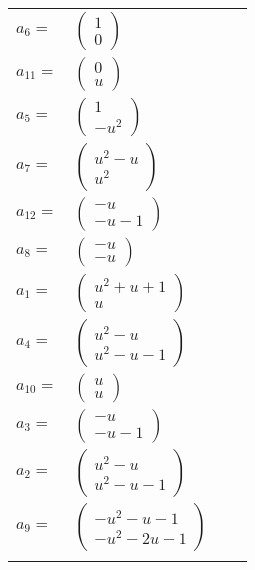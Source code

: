 \documentclass[1p]{elsarticle_modified}
\theoremstyle{definition}
\begin{document}
\begin{tabular}{m{7pt} m{180pt} m{7pt} m{180pt} }
\flushright $a_{6}=$&$\begin{pmatrix}1\\0\end{pmatrix}$ \\
\flushright $a_{11}=$&$\begin{pmatrix}0\\u\end{pmatrix}$ \\
\flushright $a_{5}=$&$\begin{pmatrix}1\\- u^2\end{pmatrix}$ \\
\flushright $a_{7}=$&$\begin{pmatrix}u^2- u\\u^2\end{pmatrix}$ \\
\flushright $a_{12}=$&$\begin{pmatrix}- u\\- u-1\end{pmatrix}$ \\
\flushright $a_{8}=$&$\begin{pmatrix}- u\\- u\end{pmatrix}$ \\
\flushright $a_{1}=$&$\begin{pmatrix}u^2+u+1\\u\end{pmatrix}$ \\
\flushright $a_{4}=$&$\begin{pmatrix}u^2- u\\u^2- u-1\end{pmatrix}$ \\
\flushright $a_{10}=$&$\begin{pmatrix}u\\u\end{pmatrix}$ \\
\flushright $a_{3}=$&$\begin{pmatrix}- u\\- u-1\end{pmatrix}$ \\
\flushright $a_{2}=$&$\begin{pmatrix}u^2- u\\u^2- u-1\end{pmatrix}$ \\
\flushright $a_{9}=$&$\begin{pmatrix}- u^2- u-1\\- u^2-2 u-1\end{pmatrix}$\\&\end{tabular}
\end{document}
